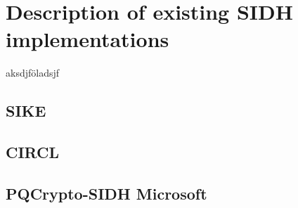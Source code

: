 \chapter{Description of existing SIDH implementations}\label{chapter:existing_sidh}
aksdjföladsjf

\section{SIKE}
\section{CIRCL}
\section{PQCrypto-SIDH Microsoft}